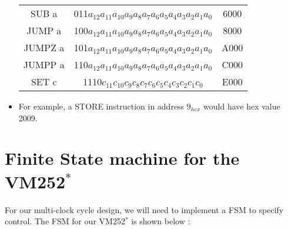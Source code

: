 \documentclass{article}
\begin{document}
\begin{itemize}
\begin{center}
\begin{tabular}{ |c|c|c| }
SUB a                                              & 011$a_{12}a_{11}a_{10}a_9a_8a_7a_6a_5a_4a_3a_2a_1a_0$                                       & 6000                                                                  \\
JUMP a                                             & 100$a_{12}a_{11}a_{10}a_9a_8a_7a_6a_5a_4a_3a_2a_1a_0$                                       & 8000                                                                  \\
JUMPZ a                                            & 101$a_{12}a_{11}a_{10}a_9a_8a_7a_6a_5a_4a_3a_2a_1a_0$                                       & A000                                                                  \\
JUMPP a                                            & 110$a_{12}a_{11}a_{10}a_9a_8a_7a_6a_5a_4a_3a_2a_1a_0$                                       & C000                                                                  \\
SET c                                              & 1110$c_{11}c_{10}c_9c_8c_7c_6c_5c_4c_3c_2c_1c_0$                                       & E000        \\
 \hline
\end{tabular}
\end{center}
\item For example, a STORE instruction in address $9_{hex}$ would have hex value 2009.
\end{itemize}


\section{Finite State machine for the VM252$^*$}
For our multi-clock cycle design, we will need to implement a FSM to specify control. The FSM for our VM252$^*$ is shown below :


\end{document}
